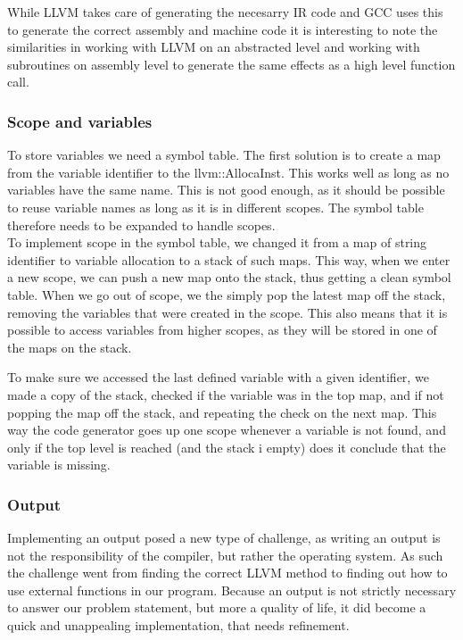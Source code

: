 While LLVM takes care of generating the necesarry IR code and GCC uses this to
generate the correct assembly and machine code it is interesting to note the
similarities in working with LLVM on an abstracted level and working with subroutines on
assembly level to generate the same effects as a high level function call.


\subsubsection{Scope and variables}
To store variables we need a symbol table. The first solution is to create a map from the variable identifier to the llvm::AllocaInst. This works well as long as no variables have the same name. This is not good enough, as it should be possible to reuse variable names as long as it is in different scopes. The symbol table therefore needs to be expanded to handle scopes.\\
To implement scope in the symbol table, we changed it from a map of string identifier to variable allocation to a stack of such maps. This way, when we enter a new scope, we can push a new map onto the stack, thus getting a clean symbol table. When we go out of scope, we the simply pop the latest map off the stack, removing the variables that were created in the scope. This also means that it is possible to access variables from higher scopes, as they will be stored in one of the maps on the stack.\\


To make sure we accessed the last defined variable with a given identifier, we made a
copy of the stack, checked if the variable was in the top map, and if not popping the
map off the stack, and repeating the check on the next map. This way the code generator goes up one scope whenever a variable is not found, and only if the top level is reached (and the stack i empty) does it conclude that the variable is missing.

\subsubsection{Output}
\label{sec:Output}
Implementing an output posed a new type of challenge, as writing an output is not the responsibility of the compiler, but rather the operating system. As such the challenge went from finding the correct LLVM method to finding out how to use external functions in our program. Because an output is not strictly necessary to answer our problem statement, but more a quality of life, it did become a quick and unappealing implementation, that needs refinement.\\

